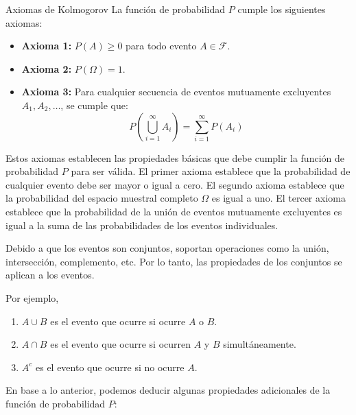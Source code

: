 \begin{definicion}{Axiomas de Kolmogorov}
La función de probabilidad $P$ cumple los siguientes axiomas:

\begin{itemize}
    \item \textbf{Axioma 1:} $P(A) \geq 0$ para todo evento $A \in \mathcal{F}$.
    \item \textbf{Axioma 2:} $P(\Omega) = 1$.
    \item \textbf{Axioma 3:} Para cualquier secuencia de eventos mutuamente excluyentes $A_1, A_2, \ldots$, se cumple que:
    $$
    P\left(\bigcup_{i=1}^{\infty} A_i\right) = \sum_{i=1}^{\infty} P(A_i)
    $$
\end{itemize}
\end{definicion}

Estos axiomas establecen las propiedades básicas que debe cumplir la función de probabilidad $P$ para ser válida. El primer axioma establece que la probabilidad de cualquier evento debe ser mayor o igual a cero. El segundo axioma establece que la probabilidad del espacio muestral completo $\Omega$ es igual a uno. El tercer axioma establece que la probabilidad de la unión de eventos mutuamente excluyentes es igual a la suma de las probabilidades de los eventos individuales.

\begin{nota}
  Debido a que los eventos son conjuntos, soportan operaciones como la unión, intersección, complemento, etc. Por lo tanto, las propiedades de los conjuntos se aplican a los eventos. 

  Por ejemplo,
  \begin{enumerate}
    \item $A \cup B$ es el evento que ocurre si ocurre $A$ o $B$. 
    \item $A \cap B$ es el evento que ocurre si ocurren $A$ y $B$ simultáneamente.
    \item $A^c$ es el evento que ocurre si no ocurre $A$.
  \end{enumerate}
\end{nota}

En base a lo anterior, podemos deducir algunas propiedades adicionales de la función de probabilidad $P$:

